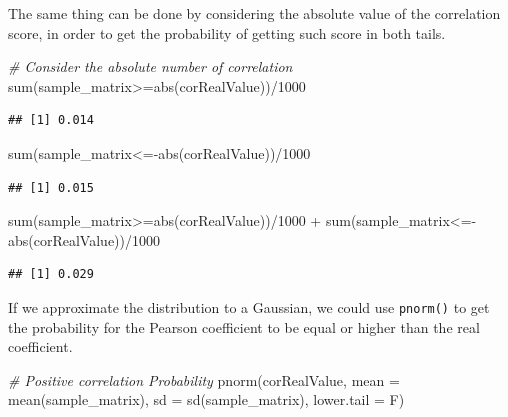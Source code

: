 \documentclass[
  notitlepage,
  onecolumn,
  openany]{book}
\newenvironment{Shaded}{\begin{snugshade}}{\end{snugshade}}
\newcommand{\AttributeTok}[1]{\textcolor[rgb]{0.77,0.63,0.00}{#1}}
\newcommand{\CommentTok}[1]{\textcolor[rgb]{0.56,0.35,0.01}{\textit{#1}}}
\newcommand{\DecValTok}[1]{\textcolor[rgb]{0.00,0.00,0.81}{#1}}
\newcommand{\FunctionTok}[1]{\textcolor[rgb]{0.00,0.00,0.00}{#1}}
\newcommand{\NormalTok}[1]{#1}
\newcommand{\SpecialCharTok}[1]{\textcolor[rgb]{0.00,0.00,0.00}{#1}}
\begin{document}
The same thing can be done by considering the absolute value of the correlation score, in order to get the probability of getting such score in both tails.

\begin{Shaded}
\begin{Highlighting}[]
\CommentTok{\# Consider the absolute number of correlation}
\FunctionTok{sum}\NormalTok{(sample\_matrix}\SpecialCharTok{\textgreater{}=}\FunctionTok{abs}\NormalTok{(corRealValue))}\SpecialCharTok{/}\DecValTok{1000}
\end{Highlighting}
\end{Shaded}

\begin{verbatim}
## [1] 0.014
\end{verbatim}

\begin{Shaded}
\begin{Highlighting}[]
\FunctionTok{sum}\NormalTok{(sample\_matrix}\SpecialCharTok{\textless{}={-}}\FunctionTok{abs}\NormalTok{(corRealValue))}\SpecialCharTok{/}\DecValTok{1000}
\end{Highlighting}
\end{Shaded}

\begin{verbatim}
## [1] 0.015
\end{verbatim}

\begin{Shaded}
\begin{Highlighting}[]
\FunctionTok{sum}\NormalTok{(sample\_matrix}\SpecialCharTok{\textgreater{}=}\FunctionTok{abs}\NormalTok{(corRealValue))}\SpecialCharTok{/}\DecValTok{1000} \SpecialCharTok{+}
  \FunctionTok{sum}\NormalTok{(sample\_matrix}\SpecialCharTok{\textless{}={-}}\FunctionTok{abs}\NormalTok{(corRealValue))}\SpecialCharTok{/}\DecValTok{1000}
\end{Highlighting}
\end{Shaded}

\begin{verbatim}
## [1] 0.029
\end{verbatim}

If we approximate the distribution to a Gaussian, we could use \texttt{pnorm()} to get the probability for the Pearson coefficient to be equal or higher than the real coefficient.

\begin{Shaded}
\begin{Highlighting}[]
\CommentTok{\# Positive correlation Probability}
\FunctionTok{pnorm}\NormalTok{(corRealValue, }\AttributeTok{mean =} \FunctionTok{mean}\NormalTok{(sample\_matrix), }
      \AttributeTok{sd =} \FunctionTok{sd}\NormalTok{(sample\_matrix), }\AttributeTok{lower.tail =}\NormalTok{ F)}
\end{Highlighting}
\end{Shaded}
\end{document}
